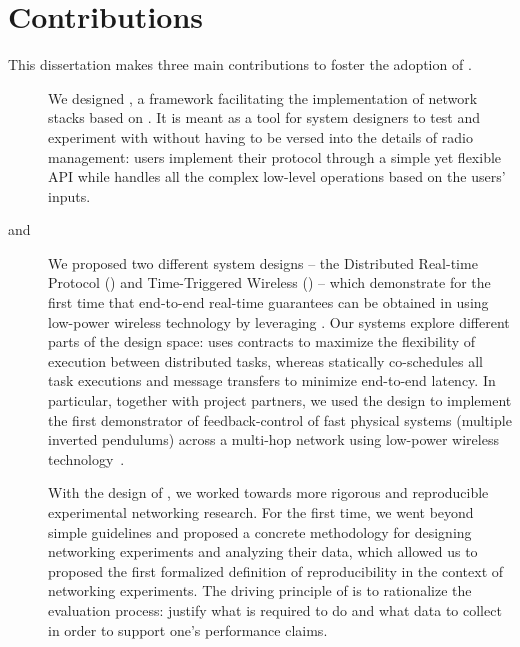 \section{Contributions}
This dissertation makes three main contributions to foster the adoption of \ST.

\begin{description}

    \item[\baloo]
    We designed \baloo, a framework facilitating the implementation of network stacks based on \ST.
    It is meant as a tool for system designers to test and experiment with \ST without having to be versed into the details of radio management: users implement their protocol through a simple yet flexible API while \baloo handles all the complex low-level operations based on the users' inputs.

    \item[\DRP and \TTW]
    We proposed two different system designs -- the Distributed Real-time Protocol (\DRP) and Time-Triggered Wireless (\TTW) -- which demonstrate for the first time that end-to-end real-time guarantees can be obtained in \CPS using low-power wireless technology by leveraging \ST.
    Our systems explore different parts of the design space:
    \DRP uses contracts to maximize the flexibility of execution between distributed tasks, whereas
    \TTW statically co-schedules all task executions and message transfers to minimize end-to-end latency.
    In particular, together with project partners, we used the \TTW design to implement the first demonstrator of feedback-control of fast physical systems (multiple inverted pendulums) across a multi-hop network using low-power wireless technology~\cite{mager2019Demo}.

    \item[\triscale]
    With the design of \triscale, we worked towards more rigorous and reproducible experimental networking research.
    For the first time, we went beyond simple guidelines and proposed a concrete methodology for designing networking experiments and analyzing their data, which allowed us to proposed the first formalized definition of reproducibility in the context of networking experiments.
    The driving principle of \triscale is to rationalize the evaluation process: \ie justify what is required to do and what data to collect in order to support one's performance claims.


\end{description}

